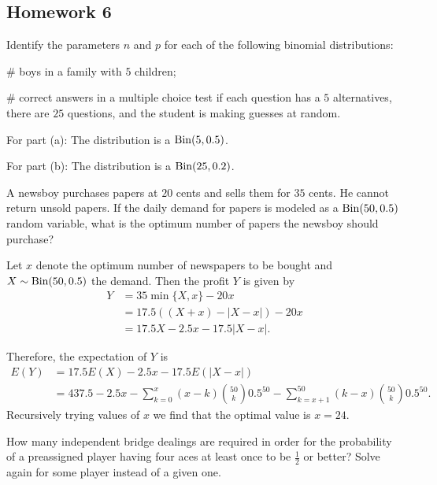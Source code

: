 \subsection{Homework 6}
\begin{problem}[Handout 8, \# 2]
  Identify the parameters \(n\) and \(p\) for each of the following
  binomial distributions:
  \begin{alphlist}
  \item \(\#\) boys in a family with \(5\) children;
  \item \(\#\) correct answers in a multiple choice test if each
    question has a \(5\) alternatives, there are \(25\) questions, and the
    student is making guesses at random.
  \end{alphlist}
\end{problem}
\begin{solution}
  For part (a): The distribution is a \(\operatorname{Bin}(5,0.5)\).

  For part (b): The distribution is a \(\operatorname{Bin}(25,0.2)\).
\end{solution}

\begin{problem}[Handout 8, \# 10]
  A newsboy purchases papers at \(20\) cents and sells them for \(35\)
  cents. He cannot return unsold papers. If the daily demand for papers is
  modeled as a \(\operatorname{Bin}(50,0.5)\) random variable, what is the optimum
  number of papers the newsboy should purchase?
\end{problem}
\begin{solution}
  Let \(x\) denote the optimum number of newspapers to be bought and
  \(X\sim\operatorname{Bin}(50,0.5)\) the demand. Then the profit \(Y\) is given by
  \begin{align*}
    Y
    &=35\min\{X,x\}-20x\\
    &=17.5((X+x)-|X-x|)-20x\\
    &=17.5X-2.5x-17.5|X-x|.
  \end{align*}

  Therefore, the expectation of \(Y\) is
  \begin{align*}
    E(Y)
    &=17.5E(X)-2.5x-17.5E(|X-x|)\\
    &=437.5-2.5x-\sum_{k=0}^x(x-k)\binom{50}{k}0.5^{50}-\sum_{k=x+1}^{50}(k-x)\binom{50}{k}0.5^{50}.
  \end{align*}
  Recursively trying values of \(x\) we find that the optimal value is
  \(x=24\).
\end{solution}

\begin{problem}[Handout 8, \# 12]
  How many independent bridge dealings are required in order for the
  probability of a preassigned player having four aces at least once to be
  \(\frac{1}{2}\) or better? Solve again for some player instead of a given
  one.
\end{problem}
\begin{solution}
\end{solution}

